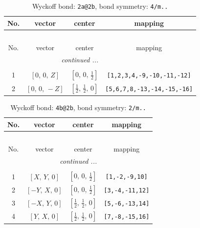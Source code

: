 \documentclass[fleqn,8pt]{jsarticle}
\begin{document}
\begin{longtable}{cccc}
\caption{Wyckoff bond: {\tt 2a@2b}, bond symmetry: {\tt 4/m..}}
 \\
 \hline \hline
No. & vector & center & mapping \\ \hline \endfirsthead

\multicolumn{3}{l}{\tablename\ \thetable{}} \\
 \hline \hline
No. & vector & center & mapping \\ \hline \endhead

 \hline \hline
\multicolumn{3}{r}{\footnotesize\it continued ...} \\ \endfoot

 \hline \hline
\multicolumn{3}{r}{} \\ \endlastfoot

1 & $\left[ 0,\, 0,\, Z \right]$ & $\left[ 0,\, 0,\, \frac{1}{2} \right]$ & {\tt [1,2,3,4,-9,-10,-11,-12]} \\ \hline
2 & $\left[ 0,\, 0,\, - Z \right]$ & $\left[ \frac{1}{2},\, \frac{1}{2},\, 0 \right]$ & {\tt [5,6,7,8,-13,-14,-15,-16]} \\
\end{longtable}
\renewcommand{\arraystretch}{1.2}
\begin{longtable}{cccc}
\caption{Wyckoff bond: {\tt 4b@2b}, bond symmetry: {\tt 2/m..}}
 \\
 \hline \hline
No. & vector & center & mapping \\ \hline \endfirsthead

\multicolumn{3}{l}{\tablename\ \thetable{}} \\
 \hline \hline
No. & vector & center & mapping \\ \hline \endhead

 \hline \hline
\multicolumn{3}{r}{\footnotesize\it continued ...} \\ \endfoot

 \hline \hline
\multicolumn{3}{r}{} \\ \endlastfoot

1 & $\left[ X,\, Y,\, 0 \right]$ & $\left[ 0,\, 0,\, \frac{1}{2} \right]$ & {\tt [1,-2,-9,10]} \\ \hline
2 & $\left[ - Y,\, X,\, 0 \right]$ & $\left[ 0,\, 0,\, \frac{1}{2} \right]$ & {\tt [3,-4,-11,12]} \\ \hline
3 & $\left[ - X,\, Y,\, 0 \right]$ & $\left[ \frac{1}{2},\, \frac{1}{2},\, 0 \right]$ & {\tt [5,-6,-13,14]} \\ \hline
4 & $\left[ Y,\, X,\, 0 \right]$ & $\left[ \frac{1}{2},\, \frac{1}{2},\, 0 \right]$ & {\tt [7,-8,-15,16]} \\
\end{longtable}
\end{document}
